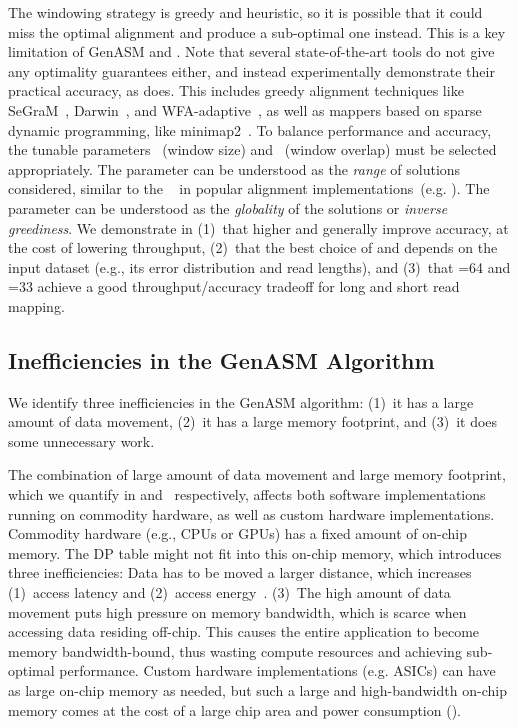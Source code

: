 The windowing strategy is greedy and heuristic, so it is possible that it could miss the optimal alignment and produce a sub-optimal one instead. This is a key limitation of GenASM and \toolname. Note that several state-of-the-art tools do not give any optimality guarantees either, and instead experimentally demonstrate their practical accuracy, as \toolname does. This includes greedy alignment techniques like SeGraM~\citep{cali2022segram}, Darwin~\citep{turakhia2019darwin}, and WFA-adaptive~\citep{wfa_algorithm}, as well as mappers based on sparse dynamic programming, like minimap2~\citep{ksw2_b}. To balance performance and accuracy, the tunable parameters ~(window size) and ~(window overlap) must be selected appropriately.
The parameter  can be understood as the \emph{range} of solutions considered, similar to the ~\citep{UKKONEN1985banded} in popular alignment implementations~(e.g. \citep{edlib,ksw2_a,ksw2_b}). The parameter  can be understood as the \emph{globality} of the solutions or \emph{inverse greediness}. We demonstrate in  (1)~that higher  and  generally improve accuracy, at the cost of lowering throughput, (2)~that the best choice of  and  depends on the input dataset (e.g., its error distribution and read lengths), and (3)~that =64 and =33 achieve a good throughput/accuracy tradeoff for long and short read mapping.






\subsection{Inefficiencies in the GenASM Algorithm} \label{sec:challenges}
We identify three inefficiencies in the GenASM algorithm: (1)~it has a large amount of data movement, (2)~it has a large memory
footprint, and (3)~it does some unnecessary work.

The combination of large amount of data movement and large memory footprint, which we quantify in  and~ respectively, affects both software implementations running on commodity hardware, as well as custom hardware implementations. 
Commodity hardware (e.g., CPUs or GPUs) has a fixed amount of on-chip memory. The DP table might not fit into this on-chip memory, which introduces three inefficiencies: Data has to be moved a larger distance, which increases (1)~access latency and (2)~access energy~\citep{boroumand2018google}. (3)~The high amount of data movement puts high pressure on memory bandwidth, which is scarce when accessing data residing off-chip. This causes the entire application to become memory bandwidth-bound, thus wasting compute resources and achieving sub-optimal performance. Custom hardware implementations (e.g. ASICs) can have as large on-chip memory as needed, but such a large and high-bandwidth on-chip memory comes at the cost of a large chip area and power consumption (\citep{boroumand2021neuraledgedevices}).

